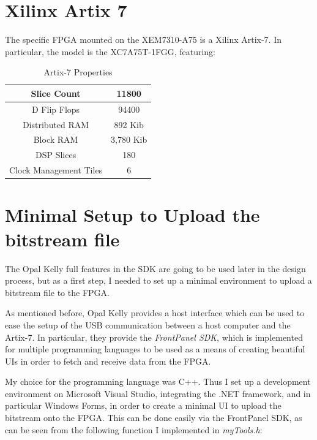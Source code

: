 \section{Xilinx Artix 7}
\label{sec:fpga-artix}
The specific FPGA mounted on the XEM7310-A75 is a Xilinx Artix-7. In particular, the model is the XC7A75T-1FGG, featuring:

\begin{table}[h!]
    \centering
    \begin{tabular}{|c|c|}
        \hline
        Slice Count & 11800 \\
        \hline
        D Flip Flops & 94400 \\
        \hline
        Distributed RAM & 892 Kib \\
        \hline
        Block RAM & 3,780 Kib \\
        \hline
        DSP Slices & 180\\
        \hline
        Clock Management Tiles & 6 \\
        \hline
    \end{tabular}
    \caption{Artix-7 Properties}
    \label{tab:artix-7-properties}
\end{table}

\section{Minimal Setup to Upload the bitstream file}
\label{sec:bitstream-setup}
The Opal Kelly full features in the SDK are going to be used later in the design process, but as a first step, I needed to set up a minimal environment to upload a bitstream file to the FPGA.

As mentioned before, Opal Kelly provides a host interface which can be used to ease the setup of the USB communication between a host computer and the Artix-7. In particular, they provide the \textit{FrontPanel SDK}, which is implemented for multiple programming languages to be used as a means of creating beautiful UIs in order to fetch and receive data from the FPGA.

My choice for the programming language was C++. Thus I set up a development environment on Microsoft Visual Studio, integrating the .NET framework, and in particular Windows Forms, in order to create a minimal UI to upload the bitstream onto the FPGA. This can be done easily via the FrontPanel SDK, as can be seen from the following function I implemented in \textit{myTools.h}:

